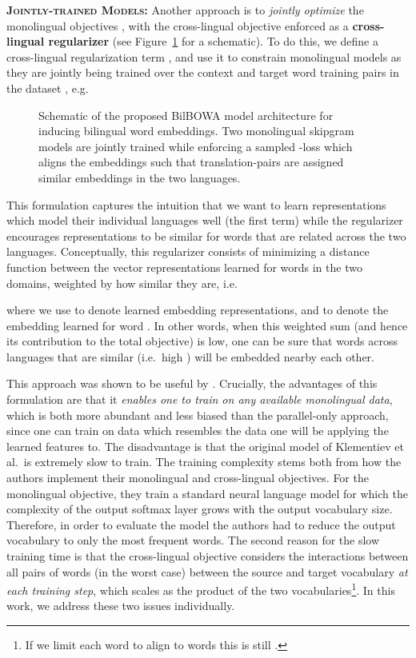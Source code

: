 \documentclass[10pt]{article}
\newcommand\bld[1]{\textbf{#1}}
\begin{document}
\textsc{\bld{Jointly-trained Models:}} Another approach is to \emph{jointly optimize}
the monolingual objectives , with the cross-lingual objective
enforced as a \bld{cross-lingual regularizer} (see
Figure~\ref{fig:bilbowa-arch} for a schematic).  To do this, we define a
cross-lingual regularization term , and use it to constrain
monolingual models as they are jointly being trained over the context 
and target word  training pairs in the dataset
, e.g.\: 


\begin{figure}
    \caption{Schematic of the proposed BilBOWA model architecture for inducing 
    bilingual word embeddings. Two monolingual skipgram models are jointly trained
    while enforcing a sampled -loss which aligns the embeddings such that   
    translation-pairs are assigned similar embeddings in the two languages.}
\label{fig:bilbowa-arch}
\end{figure}
This formulation captures the intuition that we
want to learn representations which model their individual languages well (the
first term) while the  regularizer encourages representations to
be similar for words that are related across the two languages.  Conceptually,
this regularizer consists of minimizing a distance function between the
vector representations  learned for words  in the two domains, weighted
by how similar they are, i.e.\ 

where we use  to denote learned embedding representations, and  to denote
the embedding learned for word . In other words, when this weighted sum (and
hence its contribution to the total objective) is low, one can be sure that
words across languages that are similar (i.e.\ high ) will
be embedded nearby each other. 

This approach was shown to be useful by \cite{klementiev2012}.  
Crucially, the advantages of this formulation are that it
\emph{enables one to train on any available monolingual data}, which is both more
abundant and less biased than the parallel-only approach, since one can train
on data which resembles the data one will be applying the learned features to.
The disadvantage is that the original model of Klementiev et al.\ is extremely
slow to train. The training complexity stems both from how the authors implement their
monolingual and cross-lingual objectives. For the monolingual objective, they
train a standard neural language model for which the complexity of the output 
softmax layer grows with the output vocabulary size. Therefore, in order to evaluate the model
the authors had to reduce the output vocabulary to only the  most frequent
words. The second reason for the slow training time is that the
cross-lingual objective considers the interactions between all pairs of words
(in the worst case) between the source and target vocabulary \emph{at each training step}, 
which scales as the product of the two vocabularies\footnote{If we 
limit each word to align to  words this is still .}. In this work, we address these two issues
individually.
\end{document}
